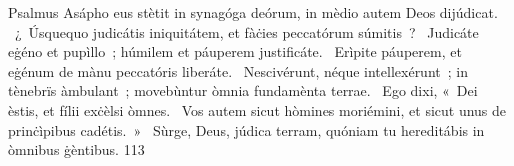 { Psalmus Asápho}
{%
eus stètit in synagóga deórum, in mèdio autem Deos dijúdicat. 
~¿~Úsquequo judicátis iniquitátem, et fàċies peccatórum súmitis~? 
~Judicáte eġéno et pupìllo~; húmilem et páuperem justificáte. 
~Erìpite páuperem, et eġénum de mànu peccatóris liberáte. 
~Nescivérunt, néque intellexérunt~; in tènebrïs àmbulant~; movebùntur òmnia fundamènta terrae. 
~Ego dixi, «~Dei èstis, et fílii exċèlsi òmnes. 
~Vos autem sicut hòmines moriémini, et sicut unus de prinċìpibus cadétis.~»
~Sùrge, Deus, júdica terram, quóniam tu hereditábis in òmnibus ġèntibus. 
}
{11}{3}
